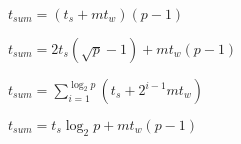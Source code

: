 \documentclass[10pt]{book}
\begin{document}
\begin{mdSnippets}
\begin{mdInlineSnippet}[76ecbdcc60db753d50e0f54442684a1f]%
$t_{sum} = (t_s + mt_w)(p - 1)$\end{mdInlineSnippet}%
\begin{mdInlineSnippet}[9f1e04740609c172e554c5544a2e4175]%
$t_{sum} = 2t_s(\sqrt {p} - 1) + mt_w(p  - 1)$\end{mdInlineSnippet}%
\begin{mdInlineSnippet}[10d3a073ed1cf5ba55cca927e2318a98]%
$t_{sum} = \sum^{\log _2 p}_{i=1}{(t_s+2^{i - 1}m{t_w})}$\end{mdInlineSnippet}%
\begin{mdInlineSnippet}[d0200a7499f424eef524040c317cc427]%
$t_{sum} = t_s{\log _2 p} + mt_w(p - 1)$\end{mdInlineSnippet}%

\end{mdSnippets}
\end{document}
